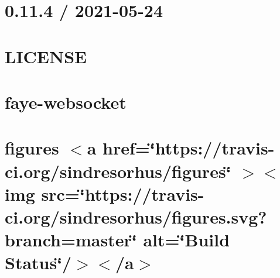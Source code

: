 \documentclass[twoside]{book}
\newcommand{\+}{\discretionary{\mbox{\scriptsize$\hookleftarrow$}}{}{}}
\begin{document}
\chapter{0.11.4 / 2021-\/05-\/24}
\label{md__c___users_vaishnavi_jadhav__desktop__developer_code_mean_stack_example_client_node_modules_fab604f51608857271222d943459e7f9e}

\chapter{LICENSE}
\label{md__c___users_vaishnavi_jadhav__desktop__developer_code_mean_stack_example_client_node_modules_faye_websocket__l_i_c_e_n_s_e}

\chapter{faye-\/websocket}
\label{md__c___users_vaishnavi_jadhav__desktop__developer_code_mean_stack_example_client_node_modules_faye_websocket__r_e_a_d_m_e}

\chapter{figures \texorpdfstring{$<$}{<}a href=\char`\"{}https\+://travis-\/ci.\+org/sindresorhus/figures\char`\"{} \texorpdfstring{$>$}{>}\texorpdfstring{$<$}{<}img src=\char`\"{}https\+://travis-\/ci.\+org/sindresorhus/figures.\+svg?branch=master\char`\"{} alt=\char`\"{}\+Build Status\char`\"{}/\texorpdfstring{$>$}{>}\texorpdfstring{$<$}{<}/a\texorpdfstring{$>$}{>}}
\label{md__c___users_vaishnavi_jadhav__desktop__developer_code_mean_stack_example_client_node_modules_figures_readme}

\end{document}
